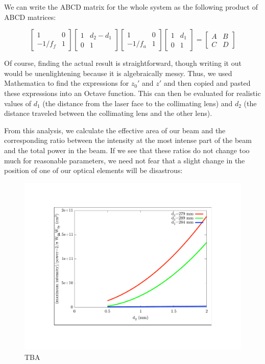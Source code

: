 We can write the ABCD matrix for the whole system as the following product of ABCD matrices: 

\begin{equation}
\begin{bmatrix}
1 & 0 \\ -1/f_{f} & 1
\end{bmatrix}
\begin{bmatrix}
1 & d_2-d_1 \\ 0 & 1
\end{bmatrix}
\begin{bmatrix}
1 & 0 \\ -1/f_{a} & 1
\end{bmatrix}
\begin{bmatrix}
1 & d_1 \\ 0 & 1
\end{bmatrix}
=
\begin{bmatrix}
A & B \\ C & D
\end{bmatrix}
\end{equation}

Of course, finding the actual result is straightforward, though writing it out would be unenlightening because it is algebraically messy. Thus, we used Mathematica to find the expressions for $z_0'$ and $z'$ and then copied and pasted these expressions into an Octave function. This can then be evaluated for realistic values of $d_1$ (the distance from the laser face to the collimating lens) and $d_2$ (the distance traveled between the collimating lens and the other lens). 

From this analysis, we calculate the effective area of our beam and the corresponding ratio between the intensity at the most intense part of the beam and the total power in the beam. If we see that these ratios do not change too much for reasonable parameters, we need not fear that a slight change in the position of one of our optical elements will be disastrous:


\begin{figure}
    \centerline{\includegraphics{waists1}}
    \caption[]{\label{fig:typicaldata}
    TBA}
\end{figure}

